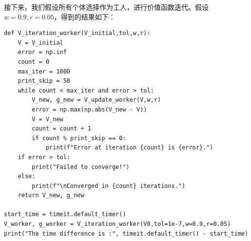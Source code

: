 \documentclass[a4paper, 12pt]{ctexart}
\begin{document}
接下来，我们假设所有个体选择作为工人，进行价值函数迭代。假设$w=0.9,r=0.05$，得到的结果如下：
\begin{lstlisting}
def V_iteration_worker(V_initial,tol,w,r):
    V = V_initial
    error = np.inf
    count = 0
    max_iter = 1000
    print_skip = 50
    while count < max_iter and error > tol:
        V_new, g_new = V_update_worker(V,w,r)
        error = np.max(np.abs(V_new - V))
        V = V_new
        count = count + 1
        if count % print_skip == 0:
            print(f"Error at iteration {count} is {error}.")
    if error > tol:
        print("Failed to converge!")
    else:
        print(f"\nConverged in {count} iterations.")
    return V_new, g_new

start_time = timeit.default_timer()
V_worker, g_worker = V_iteration_worker(V0,tol=1e-7,w=0.9,r=0.05)
print("The time difference is :", timeit.default_timer() - start_time)
\end{lstlisting}
\begin{figure}[h]
    \centering
    \nonumber
\end{figure}
\end{document}
